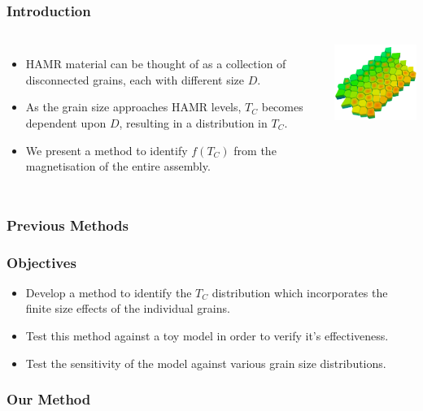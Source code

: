 \documentclass{beamer}
\begin{document}
\begin{frame}
	\frametitle{Introduction}
	\begin{columns}
		\column{7cm}
		\begin{itemize}
			\item{HAMR material can be thought of as a collection of disconnected grains, each with different size $D$.\newline}
			\item{As the grain size approaches HAMR levels, $T_C$ becomes dependent upon $D$, resulting in a distribution in $T_C$.\newline}
			\item{We present a method to identify $f(T_C)$ from the magnetisation of the entire assembly.}
		\end{itemize}
		\column{5cm}
		\includegraphics[width=5cm]{Images/grains}
	\end{columns}
\end{frame}

\begin{frame}
	\frametitle{Previous Methods}
\end{frame}

\begin{frame}
	\frametitle{Objectives}
	\begin{itemize}
		\item{Develop a method to identify the $T_C$ distribution which incorporates the finite size effects of the individual grains.\newline}
		\item{Test this method against a toy model in order to verify it's effectiveness.\newline}
		\item{Test the sensitivity of the model against various grain size distributions.\newline}
	\end{itemize}
\end{frame}

\begin{frame}
	\frametitle{Our Method}
\end{frame}
\end{document}
